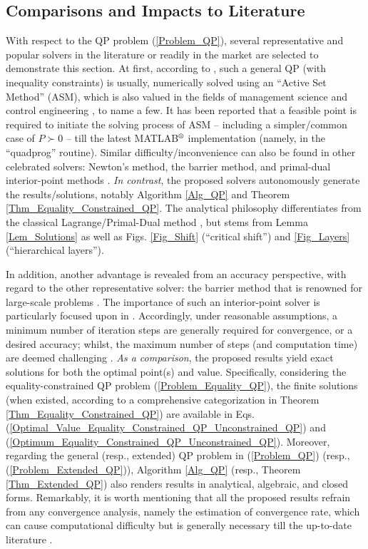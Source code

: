 \documentclass{imaman}
\numberwithin{equation}{section}
\begin{document}
\subsection{Comparisons and Impacts to Literature}
\label{Subsec_Literature_Comparison}
With respect to the QP problem (\ref{Problem_QP}), several representative and popular solvers in the literature or readily in the market \cite{NoWr:06} are selected to demonstrate this section. At first, according to \cite{Lu(Ye):03(16)}, such a general QP (with inequality constraints) is usually, numerically solved using an ``Active Set Method'' (ASM), which is also valued in the fields of management science \cite{Hey:acc,KoYa:91} and control engineering \cite{JoFo:13}, to name a few. It has been reported that a feasible point is required to initiate the solving process of ASM -- including a simpler/common case of $P\succ 0$ \cite{Lu(Ye):03(16)} -- till the latest MATLAB$\textsuperscript{\textregistered}$ implementation (namely, in the ``quadprog'' routine). Similar difficulty/inconvenience can also be found in other celebrated solvers: Newton's method, the barrier method, and primal-dual interior-point methods \cite{BoVa:04,Hey:acc,JoFo:13}. \textit{In contrast}, the proposed solvers autonomously generate the results/solutions, notably Algorithm \ref{Alg_QP} and Theorem \ref{Thm_Equality_Constrained_QP}. The analytical philosophy differentiates from the classical Lagrange/Primal-Dual method \cite{BoVa:04,Lu(Ye):03(16),NoWr:06}, but stems from Lemma \ref{Lem_Solutions} as well as Figs. \ref{Fig_Shift} (``critical shift'') and \ref{Fig_Layers} (``hierarchical layers'').

In addition, another advantage is revealed from an accuracy perspective, with regard to the other representative solver: the barrier method that is renowned for large-scale problems \cite{JoFo:13}. The importance of such an interior-point solver is particularly focused upon in \cite[Chapter 11]{BoVa:04}. Accordingly, under reasonable assumptions, a minimum number of iteration steps are generally required for convergence, or a desired accuracy; whilst, the maximum number of steps (and computation time) are deemed challenging \cite{JoFo:13}. \textit{As a comparison}, the proposed results yield exact solutions for both the optimal point(s) and value. Specifically, considering the equality-constrained QP problem (\ref{Problem_Equality_QP}), the finite solutions (when existed, according to a comprehensive categorization in Theorem \ref{Thm_Equality_Constrained_QP}) are available in Eqs. (\ref{Optimal_Value_Equality_Constrained_QP_Unconstrained_QP}) and (\ref{Optimum_Equality_Constrained_QP_Unconstrained_QP}). Moreover, regarding the general (resp., extended) QP problem in (\ref{Problem_QP}) (resp., (\ref{Problem_Extended_QP})), Algorithm \ref{Alg_QP} (resp., Theorem \ref{Thm_Extended_QP}) also renders results in analytical, algebraic, and closed forms. Remarkably, it is worth mentioning that all the proposed results refrain from any convergence analysis, namely the estimation of convergence rate, which can cause computational difficulty \cite{DuJoWaWi:15} but is generally necessary till the up-to-date literature \cite{LiTsWo:20,MATLAB}.
\end{document}

